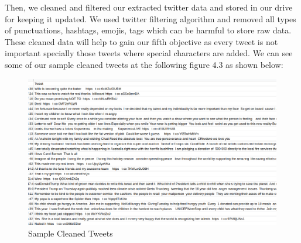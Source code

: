 Then, we cleaned and filtered our extracted twitter data and stored in our drive for keeping it updated. We used twitter filtering algorithm and removed all types of punctuations, hashtags, emojis, tags which can be harmful to store raw data. These cleaned data will help to gain our fifth objective as every tweet is not important specially those tweets where special characters are added. We can see some of our sample cleaned tweets at the following figure 4.3 as shown below:\\
\begin{figure}[H]
    \centering
    \includegraphics[scale=.5]{img4/clean.png}
    \caption{Sample Cleaned Tweets}
    \label{fig:clean}
\end{figure}


